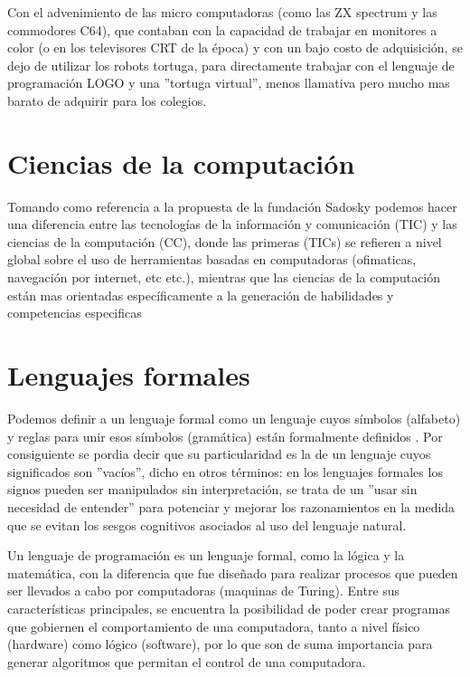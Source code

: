 Con el advenimiento de las micro computadoras (como las ZX spectrum y las commodores C64), que contaban con la capacidad de trabajar  en monitores a color (o en los televisores CRT de la época) y con un bajo costo de adquisición, se dejo de utilizar los robots tortuga, para directamente trabajar con el lenguaje de programación LOGO y una ''tortuga virtual'', menos llamativa pero mucho mas barato de adquirir para los colegios.

\section{Ciencias de la computación}

Tomando como referencia a la propuesta de la fundación Sadosky \citep{sadosky2013cc} podemos hacer una diferencia entre las  tecnologías de la  información y comunicación (TIC) y las ciencias de la computación (CC), donde las primeras (TICs) se refieren a nivel global sobre el uso de herramientas basadas en computadoras (ofimaticas, navegación por internet, etc etc.), mientras que las ciencias de la computación están mas orientadas específicamente a la generación de habilidades y competencias especificas 

\section{Lenguajes formales}

Podemos definir a un lenguaje formal como un lenguaje cuyos símbolos (alfabeto) y reglas para unir esos símbolos (gramática) están formalmente definidos \citep{giro_lenguaje_2015}. Por consiguiente se pordia decir que su particularidad  es la de un lenguaje cuyos significados son ''vacíos'', dicho en otros términos: en los lenguajes formales los signos pueden ser manipulados sin interpretación, se trata de un ''usar sin necesidad de entender'' para potenciar y mejorar los razonamientos en la medida que se evitan los sesgos cognitivos asociados al uso del lenguaje natural.

Un lenguaje de programación es un lenguaje formal, como la lógica y la matemática, con la diferencia que fue diseñado para realizar procesos que pueden ser llevados a cabo por computadoras (maquinas de Turing). Entre sus características principales, se encuentra la posibilidad de poder crear programas que gobiernen el comportamiento de una computadora, tanto a nivel físico (hardware) como lógico (software), por lo que son de suma importancia para generar algoritmos que permitan el control de una computadora.

